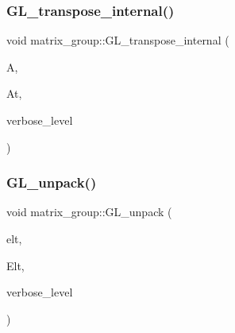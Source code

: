 \mbox{\label{classmatrix__group_a926cb685143d1918d26802031ed1c679}} 
\subsubsection{\texorpdfstring{G\+L\+\_\+transpose\+\_\+internal()}{GL\_transpose\_internal()}}
{\footnotesize\ttfamily void matrix\+\_\+group\+::\+G\+L\+\_\+transpose\+\_\+internal (\begin{DoxyParamCaption}\item[{\mbox{\hyperlink{galois_8h_a09fddde158a3a20bd2dcadb609de11dc}{I\+NT}} $\ast$}]{A,  }\item[{\mbox{\hyperlink{galois_8h_a09fddde158a3a20bd2dcadb609de11dc}{I\+NT}} $\ast$}]{At,  }\item[{\mbox{\hyperlink{galois_8h_a09fddde158a3a20bd2dcadb609de11dc}{I\+NT}}}]{verbose\+\_\+level }\end{DoxyParamCaption})}

\mbox{\label{classmatrix__group_ac6a8a5bf87707f613215662a2967fa18}} 
\subsubsection{\texorpdfstring{G\+L\+\_\+unpack()}{GL\_unpack()}}
{\footnotesize\ttfamily void matrix\+\_\+group\+::\+G\+L\+\_\+unpack (\begin{DoxyParamCaption}\item[{\mbox{\hyperlink{galois_8h_a122c4acf389c050379f00341fdcd5812}{U\+B\+Y\+TE}} $\ast$}]{elt,  }\item[{\mbox{\hyperlink{galois_8h_a09fddde158a3a20bd2dcadb609de11dc}{I\+NT}} $\ast$}]{Elt,  }\item[{\mbox{\hyperlink{galois_8h_a09fddde158a3a20bd2dcadb609de11dc}{I\+NT}}}]{verbose\+\_\+level }\end{DoxyParamCaption})}

\mbox{\label{classmatrix__group_af22c97524c6a2667c4371cb228e47cc9}} 
